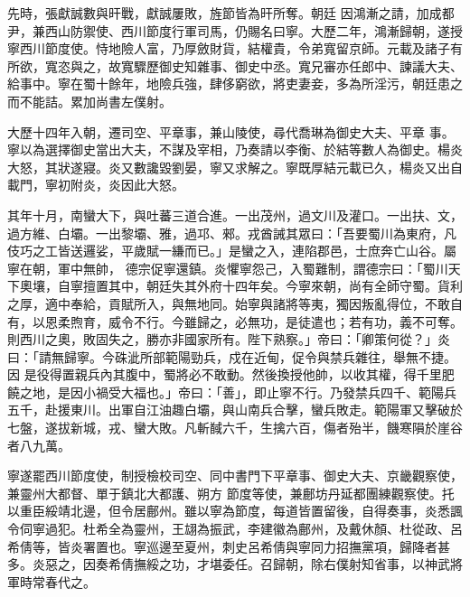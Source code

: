 \begin{pinyinscope}
 先時，張獻誠數與旰戰，獻誠屢敗，旌節皆為旰所奪。朝廷
 因鴻漸之請，加成都尹，兼西山防禦使、西川節度行軍司馬，仍賜名曰寧。大歷二年，鴻漸歸朝，遂授寧西川節度使。恃地險人富，乃厚斂財貨，結權貴，令弟寬留京師。元載及諸子有所欲，寬恣與之，故寬驟歷御史知雜事、御史中丞。寬兄審亦任郎中、諫議大夫、給事中。寧在蜀十餘年，地險兵強，肆侈窮欲，將吏妻妾，多為所淫污，朝廷患之而不能詰。累加尚書左僕射。



 大歷十四年入朝，遷司空、平章事，兼山陵使，尋代喬琳為御史大夫、平章
 事。寧以為選擇御史當出大夫，不謀及宰相，乃奏請以李衡、於結等數人為御史。楊炎大怒，其狀遂寢。炎又數讒毀劉晏，寧又求解之。寧既厚結元載已久，楊炎又出自載門，寧初附炎，炎因此大怒。



 其年十月，南蠻大下，與吐蕃三道合進。一出茂州，過文川及灌口。一出扶、文，過方維、白壩。一出黎壩、雅，過邛、郲。戎酋誡其眾曰：「吾要蜀川為東府，凡伎巧之工皆送邏娑，平歲賦一縑而已。」是蠻之入，連陷郡邑，士庶奔亡山谷。屬寧在朝，軍中無帥，
 德宗促寧還鎮。炎懼寧怨己，入蜀難制，謂德宗曰：「蜀川天下奧壤，自寧擅置其中，朝廷失其外府十四年矣。今寧來朝，尚有全師守蜀。貨利之厚，適中奉給，貢賦所入，與無地同。始寧與諸將等夷，獨因叛亂得位，不敢自有，以恩柔煦育，威令不行。今雖歸之，必無功，是徒遣也；若有功，義不可奪。則西川之奧，敗固失之，勝亦非國家所有。陛下熟察。」帝曰：「卿策何從？」炎曰：「請無歸寧。今硃泚所部範陽勁兵，戍在近甸，促令與禁兵雜往，舉無不捷。因
 是役得置親兵內其腹中，蜀將必不敢動。然後換授他帥，以收其權，得千里肥饒之地，是因小禍受大福也。」帝曰：「善」，即止寧不行。乃發禁兵四千、範陽兵五千，赴援東川。出軍自江油趣白壩，與山南兵合擊，蠻兵敗走。範陽軍又擊破於七盤，遂拔新城，戎、蠻大敗。凡斬馘六千，生擒六百，傷者殆半，饑寒隕於崖谷者八九萬。



 寧遂罷西川節度使，制授檢校司空、同中書門下平章事、御史大夫、京畿觀察使，兼靈州大都督、單于鎮北大都護、朔方
 節度等使，兼鄜坊丹延都團練觀察使。托以重臣綏靖北邊，但令居鄜州。雖以寧為節度，每道皆置留後，自得奏事，炎悉諷令伺寧過犯。杜希全為靈州，王翃為振武，李建徽為鄜州，及戴休顏、杜從政、呂希倩等，皆炎署置也。寧巡邊至夏州，刺史呂希倩與寧同力招撫黨項，歸降者甚多。炎惡之，因奏希倩撫綏之功，才堪委任。召歸朝，除右僕射知省事，以神武將軍時常春代之。




\end{pinyinscope}
